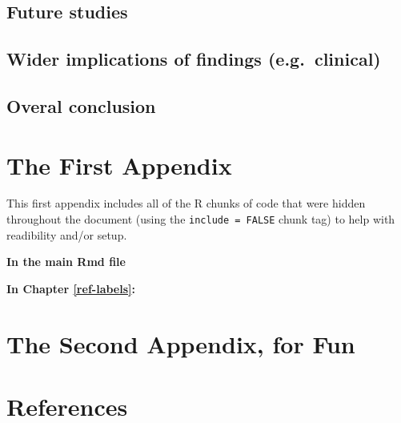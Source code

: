 \documentclass[11pt,twoside]{bristolthesis}
\begin{document}
\hypertarget{future-studies}{%
\section{Future studies}\label{future-studies}}

\hypertarget{wider-implications-of-findings-e.g.-clinical}{%
\section{Wider implications of findings (e.g.~clinical)}\label{wider-implications-of-findings-e.g.-clinical}}

\hypertarget{overal-conclusion}{%
\section{Overal conclusion}\label{overal-conclusion}}

\appendix

\hypertarget{the-first-appendix}{%
\chapter{The First Appendix}\label{the-first-appendix}}

This first appendix includes all of the R chunks of code that were hidden throughout the document (using the \texttt{include\ =\ FALSE} chunk tag) to help with readibility and/or setup.

\textbf{In the main Rmd file}

\textbf{In Chapter \ref{ref-labels}:}

\hypertarget{the-second-appendix-for-fun}{%
\chapter{The Second Appendix, for Fun}\label{the-second-appendix-for-fun}}

\backmatter

\hypertarget{references}{%
\chapter*{References}\label{references}}


\noindent

\setlength{\parindent}{-0.20in}
\setlength{\leftskip}{0.20in}
\setlength{\parskip}{8pt}
\end{document}

